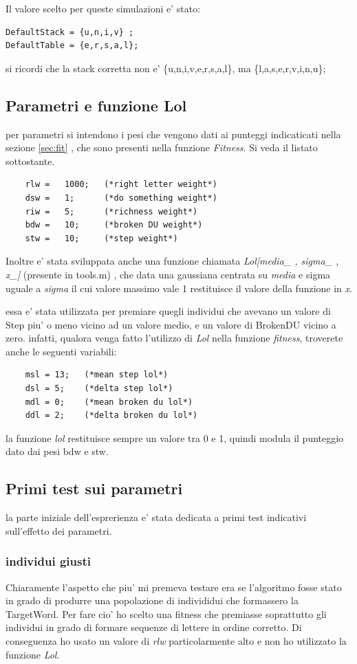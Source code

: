 \documentclass[12pt, a4paper]{article}
\begin{document}
Il valore scelto per queste simulazioni e' stato: 

\begin{lstlisting}
DefaultStack = {u,n,i,v} ;
DefaultTable = {e,r,s,a,l};
\end{lstlisting}

si ricordi che la stack corretta non e' \{u,n,i,v,e,r,s,a,l\}, ma \{l,a,s,e,r,v,i,n,u\};

\subsection{Parametri e funzione Lol}
per parametri si intendono i pesi che vengono dati ai punteggi indicaticati nella sezione \ref{sec:fit} , che sono presenti nella funzione {\itshape Fitness}.
Si veda il listato sottostante.
\begin{lstlisting}
	rlw	=	1000;	(*right letter weight*)
	dsw	=	1;		(*do something weight*)
	riw	=	5;		(*richness weight*) 
	bdw	=	10;		(*broken DU weight*) 
	stw	=	10;		(*step weight*) 
\end{lstlisting}

Inoltre e' stata sviluppata anche una funzione chiamata {\itshape Lol[media\_ , sigma\_ , x\_]} (presente in tools.m) , che data una gaussiana centrata su {\itshape media} e sigma uguale a {\itshape sigma} il cui valore massimo vale 1 restituisce il valore della funzione in {\itshape x}.

essa e' stata utilizzata per premiare quegli individui che avevano un valore di Step piu' o meno vicino ad un valore medio, e un valore di BrokenDU vicino a zero.
infatti, qualora venga fatto l'utilizzo di {\itshape Lol} nella funzione {\itshape fitness}, troverete anche le seguenti variabili:
\begin{lstlisting}
	msl = 13;	(*mean step lol*) 
	dsl = 5;	(*delta step lol*) 
	mdl = 0;	(*mean broken du lol*) 
	ddl = 2;	(*delta broken du lol*) 
\end{lstlisting}

la funzione {\itshape lol} restituisce sempre un valore tra 0 e 1, quindi modula il punteggio dato dai pesi bdw e stw.

\subsection{Primi test sui parametri}
la parte iniziale dell'esprerienza e' stata dedicata a primi test indicativi sull'effetto dei parametri.
\subsubsection{individui giusti}
Chiaramente l'aspetto che piu' mi premeva testare era se l'algoritmo fosse stato in grado di produrre una popolazione di individidui che formassero la TargetWord.
Per fare cio' ho scelto una fitness che premiasse soprattutto gli individui in grado di formare sequenze di lettere in ordine corretto.
Di conseguenza ho usato un valore di {\itshape rlw} particolarmente alto e non ho utilizzato la funzione {\itshape Lol}.
\end{document}
